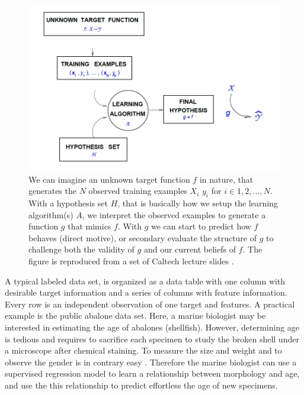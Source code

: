 \begin{figure}[!htbp]
\includegraphics[width=\textwidth,height=\textheight,keepaspectratio]{graphics/sketchMLmapping.png}
\caption{We can imagine an unknown target function $f$ in nature, that generates the $N$ observed training examples $X_i$ $y_i$ for $i \in 1,2,...,N$. With a hypothesis set $H$, that is basically how we setup the learning algorithm(s) $A$, we interpret the observed examples to generate a function $g$ that mimics $f$. With $g$ we can start to predict how $f$ behaves (direct motive), or secondary evaluate the structure of $g$ to challenge both the validity of $g$ and our current beliefs of $f$.
The figure is reproduced from a set of Caltech lecture slides \cite{Mostafa13learning}.
}
\label{modelPredictExplain}
\end{figure}

A typical labeled data set, is organized as a data table with one column with desirable target information and a series of columns with feature information. Every row is an independent observation of one target and features. A practical example is the public abalone data set. Here, a marine biologist may be interested in estimating the age of abalones (shellfish). However, determining age is tedious and requires to sacrifice each specimen to study the broken shell under a microscope after chemical staining. To measure the size and weight and to observe the gender is in contrary easy \cite{lichman2013uci}. Therefore the marine biologist can use a supervised regression model to learn a relationship between morphology and age, and use the this relationship to predict effortless the age of new specimens.

